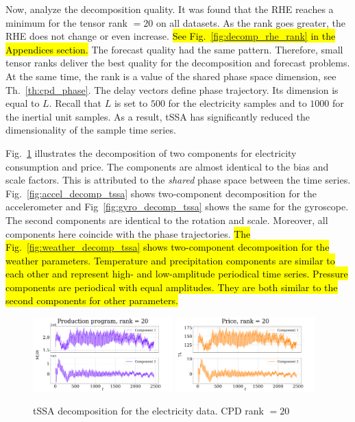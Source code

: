\documentclass[referee, pdflatex, sn-mathphys-num]{sn-jnl}
\theoremstyle{definition}
\theoremstyle{plain}
\begin{document}
	Now, analyze the decomposition quality. It was found that the RHE reaches a minimum for the tensor rank $ = 20 $ on all datasets. As the rank goes greater, the RHE does not change or even increase. \hl{See Fig.~{\ref{fig:decomp_rhe_rank}} in the Appendices section.} The forecast quality had the same pattern. Therefore, small tensor ranks deliver the best quality for the decomposition and forecast problems. At the same time, the rank is a value of the shared phase space dimension, see Th.~\ref{th:cpd_phase}. The delay vectors define phase trajectory. Its dimension is equal to $L$. Recall that $ L $ is set to $ 500 $ for the electricity samples and to $ 1000 $ for the inertial unit samples. As a result, tSSA has significantly reduced the dimensionality of the sample time series.
	
	Fig.~\ref{fig:electr_decomp_tssa} illustrates the decomposition of two components for electricity consumption and price. The components are almost identical to the bias and scale factors. This is attributed to the \emph{shared} phase space between the time series. Fig.~\ref{fig:accel_decomp_tssa} shows two-component decomposition for the accelerometer and Fig~\ref{fig:gyro_decomp_tssa} shows the same for the gyroscope. The second components are identical to the rotation and scale. Moreover, all components here coincide with the phase trajectories. \hl{The Fig.~{\ref{fig:weather_decomp_tssa}} shows two-component decomposition for the weather parameters. Temperature and precipitation components are similar to each other and represent high- and low-amplitude periodical time series. Pressure components are periodical with equal amplitudes. They are both similar to the second components for other parameters.} 
	
	\begin{figure}[h]
		\centering
		\includegraphics[width=0.48\textwidth, keepaspectratio]{Production program_decomp.png}
		\includegraphics[width=0.48\textwidth, keepaspectratio]{Price_decomp.png}
		\caption{tSSA decomposition for the electricity data. CPD rank $ = 20 $}\label{fig:electr_decomp_tssa}
	\end{figure}
	
\end{document}
